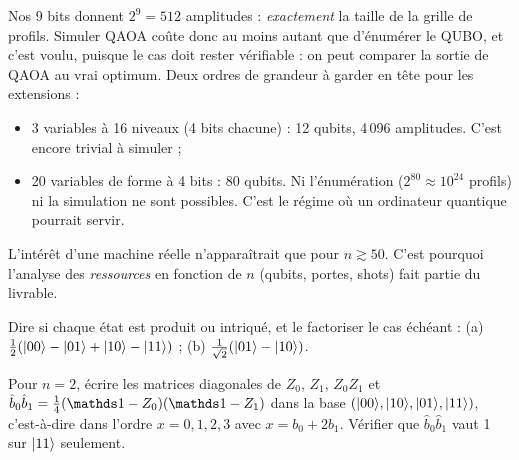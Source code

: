 \begin{projet}
Nos 9 bits donnent $2^9=512$ amplitudes : \emph{exactement} la taille de la grille de profils. Simuler QAOA coûte donc au moins autant que d'énumérer le QUBO, et c'est voulu, puisque le cas doit rester vérifiable : on peut comparer la sortie de QAOA au vrai optimum. Deux ordres de grandeur à garder en tête pour les extensions :
\begin{itemize}
\item 3 variables à 16 niveaux (4 bits chacune) : 12 qubits, 4\,096 amplitudes. C'est encore trivial à simuler ;
\item 20 variables de forme à 4 bits : 80 qubits. Ni l'énumération ($2^{80}\approx10^{24}$ profils) ni la simulation ne sont possibles. C'est le régime où un ordinateur quantique pourrait servir.
\end{itemize}
L'intérêt d'une machine réelle n'apparaîtrait que pour $n\gtrsim50$. C'est pourquoi l'analyse des \emph{ressources} en fonction de $n$ (qubits, portes, shots) fait partie du livrable.
\end{projet}

\exercices
\begin{exercice}
Dire si chaque état est produit ou intriqué, et le factoriser le cas échéant : (a) $\tfrac12(\lvert 00\rangle-\lvert 01\rangle+\lvert 10\rangle-\lvert 11\rangle)$ ; (b) $\tfrac1{\sqrt2}(\lvert 01\rangle-\lvert 10\rangle)$.
\end{exercice}
\begin{exercice}
Pour $n=2$, écrire les matrices diagonales de $Z_0$, $Z_1$, $Z_0Z_1$ et $\hat b_0\hat b_1=\tfrac14(\Id-Z_0)(\Id-Z_1)$ dans la base $(\lvert 00\rangle,\lvert 10\rangle,\lvert 01\rangle,\lvert 11\rangle)$, c'est-à-dire dans l'ordre $x=0,1,2,3$ avec $x=b_0+2b_1$. Vérifier que $\hat b_0\hat b_1$ vaut 1 sur $\lvert 11\rangle$ seulement.
\end{exercice}
